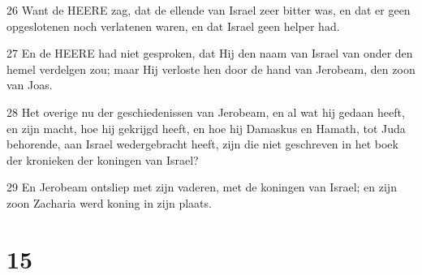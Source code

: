\par 26 Want de HEERE zag, dat de ellende van Israel zeer bitter was, en dat er geen opgeslotenen noch verlatenen waren, en dat Israel geen helper had.
\par 27 En de HEERE had niet gesproken, dat Hij den naam van Israel van onder den hemel verdelgen zou; maar Hij verloste hen door de hand van Jerobeam, den zoon van Joas.
\par 28 Het overige nu der geschiedenissen van Jerobeam, en al wat hij gedaan heeft, en zijn macht, hoe hij gekrijgd heeft, en hoe hij Damaskus en Hamath, tot Juda behorende, aan Israel wedergebracht heeft, zijn die niet geschreven in het boek der kronieken der koningen van Israel?
\par 29 En Jerobeam ontsliep met zijn vaderen, met de koningen van Israel; en zijn zoon Zacharia werd koning in zijn plaats.

\chapter{15}

